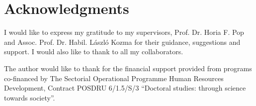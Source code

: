 \chapter*{Acknowledgments}
\thispagestyle{empty}
\addtocounter{page}{-1}

I would like to express my gratitude to my supervisors, Prof. Dr. Horia F. Pop and Assoc. Prof. Dr. Habil. L\'{a}szl\'{o} Kozma for their guidance, suggestions and support. I would also like to thank to all my collaborators. 

The author would like to thank for the financial support provided from programs co-financed by The Sectorial Operational Programme Human Resources Development, Contract POSDRU 6/1.5/S/3 ``Doctoral studies: through science towards society''.